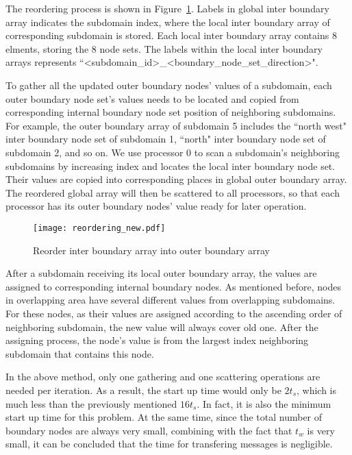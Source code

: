 \documentclass{sig-alternate}
\begin{document}
	The reordering process is shown in Figure~\ref{Fig4}. Labels in global inter boundary array indicates the subdomain index, where
	the local inter boundary array of corresponding subdomain is stored. Each local inter boundary array contains 8 elments, storing
	the 8 node sets. The labels within the local
	inter boundary arrays represents ``<subdomain\_id>\_<boundary\_node\_set\_direction>".

	To gather all the updated outer boundary nodes' values of a subdomain, each outer boundary node set's values needs to be located
	and copied from corresponding internal boundary node set position of neighboring subdomains. For example, the 
	outer boundary array of subdomain 5 includes the ``north west" inter boundary node set of subdomain 1, ``north" inter boundary 
	node set of 
	subdomain 2, and so on. We use processor 0 to scan a subdomain's neighboring subdomains by increasing index and locates the 
	local inter boundary node set. Their values are copied into corresponding places in global outer boundary array. The 
	reordered global array will then be scattered to all processors, so that each processor has its outer boundary nodes' value 
	ready for later operation. 
	\begin{figure}[htbp]
	  \centering
	  \texttt{[image: reordering\_new.pdf]}
	  \caption{Reorder inter boundary array into outer boundary array}
	  \label{Fig4}
	\end{figure}

	After a subdomain receiving its local outer boundary array, the values are assigned to corresponding internal boundary 
	nodes. As 
	mentioned before, nodes in overlapping area have several different values from overlapping subdomains. For these nodes, 
	as their values are assigned according to the ascending order of neighboring subdomain, the new value will always cover old one. 
	After the assigning process, the node's value is from the largest index neighboring subdomain that contains this node.  
	
	In the above method, only one gathering and one scattering operations are needed per iteration. As a result, the start up time 
	would only be $2t_s$, which is much less than the previously mentioned $16t_s$. In fact, it is also the minimum 
	start up time for this problem. At the same time, since the total number 
	of boundary nodes are always very small, combining with the fact that $t_w$ is very small, it can be concluded that the 
	time for transfering messages is negligible. 
\end{document}
